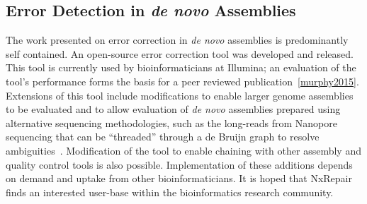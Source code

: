\subsection{Error Detection in \emph{de novo} Assemblies}
The work presented on error correction in \emph{de novo} assemblies is predominantly self contained. An open-source error correction tool was developed and released. This tool is currently used by bioinformaticians at Illumina; an evaluation of the tool's performance forms the basis for a peer reviewed publication~\ref{murphy2015}. Extensions of this tool include modifications to enable larger genome assemblies to be evaluated and to allow evaluation of \emph{de novo} assemblies prepared using alternative sequencing methodologies, such as the long-reads from Nanopore sequencing that can be ``threaded'' through a de Bruijn graph to resolve ambiguities~\cite{Koren2015}. Modification of the tool to enable chaining with other assembly and quality control tools is also possible. Implementation of these additions depends on demand and uptake from other bioinformaticians. It is hoped that NxRepair finds an interested user-base within the bioinformatics research community.
